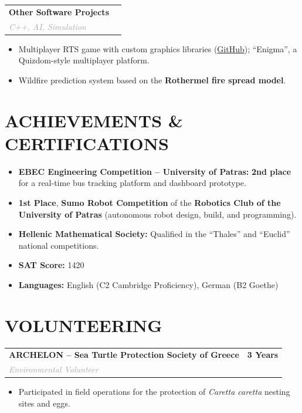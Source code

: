 \documentclass[10pt, a4paper]{article}
\makeatletter
\newcommand{\cvitem}[4]{
    \noindent
    \begin{tabularx}{\textwidth}{@{}X r@{}}
        \textbf{#1} & \textcolor{primary}{\textbf{#2}} \\
        \textit{\textcolor{darkgray}{#3}} & \textcolor{lightgray}{\small #4} \\
    \end{tabularx}
    \vspace{2pt}
}
\makeatother
\begin{document}
\vspace{0.35em}

\cvitem
{Other Software Projects}
{}
{C++, AI, Simulation}
{}

\begin{itemize}[leftmargin=1.2em, topsep=0pt, itemsep=1pt]
    \item Multiplayer RTS game with custom graphics libraries (\href{https://github.com/Kostantinoskanell/Real-Strategy-Game-Upatras}{GitHub}); ``Enigma'', a Quizdom-style multiplayer platform.
    \item Wildfire prediction system based on the \textbf{Rothermel fire spread model}.
\end{itemize}

\section*{ACHIEVEMENTS \& CERTIFICATIONS}

\begin{itemize}[leftmargin=1.2em, itemsep=2pt]
\item \textbf{EBEC Engineering Competition -- University of Patras:}
\textbf{2nd place} for a real-time bus tracking platform and dashboard prototype.
\item \textbf{1st Place}, \textbf{Sumo Robot Competition} of the \textbf{Robotics Club of the University of Patras} (autonomous robot design, build, and programming).
\item \textbf{Hellenic Mathematical Society:} Qualified in the ``Thales'' and ``Euclid'' national competitions.
\item \textbf{SAT Score:} 1420
\item \textbf{Languages:} English (C2 Cambridge Proficiency), German (B2 Goethe)
\end{itemize}

\section*{VOLUNTEERING}

\cvitem
{ARCHELON -- Sea Turtle Protection Society of Greece}
{3 Years}
{Environmental Volunteer}
{}

\begin{itemize}[leftmargin=1.2em, topsep=0pt, itemsep=1pt]
    \item Participated in field operations for the protection of \textit{Caretta caretta} nesting sites and eggs.
\end{itemize}
\end{document}
